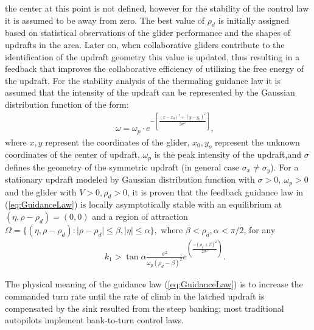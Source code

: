 \documentclass{ifacconf}
\newcommand{\squeezeup}{\vspace{-3.0mm}}
\begin{document}
the center at this point is not defined, however for the stability of the
control law it is assumed to be away from zero. The best value of $\rho_d$ is
initially assigned based on statistical observations of the glider
performance and the shapes of updrafts in the area. Later on, when
collaborative gliders contribute to the identification of the updraft
geometry this value is updated, thus resulting in a feedback that improves
the collaborative efficiency of utilizing the free energy of the updraft. For
the stability analysis of the thermaling guidance law it is assumed that the
intensity of the updraft can be represented by the Gaussian distribution
function of the form:
\begin{eqnarray}
    && \omega=\omega_p \cdot e^{-[\frac{(x-x_0)^2+(y-y_0)^2}{2\sigma^2}]},
    \label{eq:GaussUpdraft}
\end{eqnarray}
where $x, y$ represent the coordinates of the glider, $x_0, y_o$ represent
the unknown coordinates of the center of updraft, $\omega_p$ is the peak
intensity of the updraft,and $\sigma$ defines the geometry of the symmetric
updraft (in general case $\sigma_x \neq \sigma_y$). For a stationary updraft
modeled by Gaussian distribution function with $\sigma>0,~\omega_p>0$ and the
glider with $V>0, \rho_d>0$, it is proven that the feedback guidance law in
(\ref{eq:GuidanceLaw}) is locally asymptotically stable with an equilibrium
at $(\eta, \rho-\rho_d)=(0,0)$ and a region of attraction $\Omega=\{(\eta,
\rho-\rho_d): \vert \rho-\rho_d \vert \leq \beta,  \vert \eta \vert \leq
\alpha \}, $ where $\beta < \rho_d, \alpha< \pi/2$, for any
\begin{eqnarray}
    && k_1 > \tan \alpha \frac{\sigma^2}{\omega_p(\rho_d-\beta)^2}
    e^(\frac{-(\rho_d+\beta)^2}{2\sigma^2} ).\nonumber
    \label{eq:GuidanceGain}
\end{eqnarray}

The physical meaning of the guidance law (\ref{eq:GuidanceLaw}) is to
increase the commanded turn rate until the rate of climb in the latched
updraft is compensated by the sink resulted from the steep banking; most
traditional autopilots implement bank-to-turn control laws. \squeezeup
\end{document}
